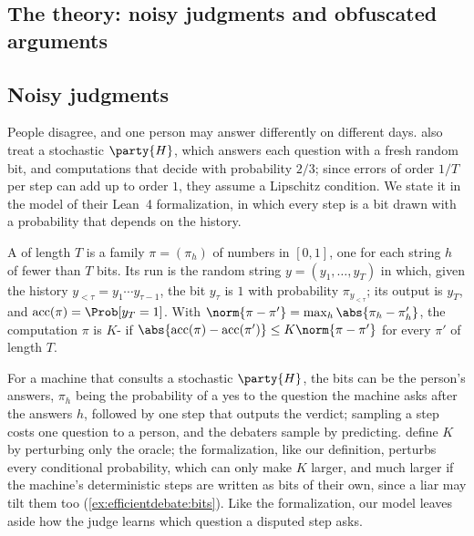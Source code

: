 \begin{refsection}
\section{The theory: noisy judgments and obfuscated arguments}\label{sec:efficientdebate:noisy}

\subsection{Noisy judgments}\label{sec:efficientdebate:stochastic}

People disagree, and one person may answer differently on different days. \Textcite{BrownCohenEtAl2024} also treat a stochastic $\party{H}$, which answers each question with a fresh random bit, and computations that decide with probability $2/3$; since errors of order $1/T$ per step can add up to order $1$, they assume a Lipschitz condition. We state it in the model of their Lean~4 formalization, in which every step is a bit drawn with a probability that depends on the history.

\begin{definition}\label{def:efficientdebate:stochastic}
A  of length $T$ is a family $\pi=(\pi_h)$ of numbers in $[0,1]$, one for each string $h$ of fewer than $T$ bits. Its run is the random string $y=(y_1,\dots,y_T)$ in which, given the history $y_{<\tau}=y_1\cdots y_{\tau-1}$, the bit $y_\tau$ is $1$ with probability $\pi_{y_{<\tau}}$; its output is $y_T$, and $\efficientdebateacc(\pi)=\Prob[y_T=1]$. With $\norm{\pi-\pi'}=\max_h\abs{\pi_h-\pi'_h}$, the computation $\pi$ is $K$- if $\abs{\efficientdebateacc(\pi)-\efficientdebateacc(\pi')}\le K\norm{\pi-\pi'}$ for every $\pi'$ of length $T$.
\end{definition}

For a machine that consults a stochastic $\party{H}$, the bits can be the person's answers, $\pi_h$ being the probability of a yes to the question the machine asks after the answers $h$, followed by one step that outputs the verdict; sampling a step costs one question to a person, and the debaters sample by predicting. \Textcite[Definition~6.1]{BrownCohenEtAl2024} define $K$ by perturbing only the oracle; the formalization, like our definition, perturbs every conditional probability, which can only make $K$ larger, and much larger if the machine's deterministic steps are written as bits of their own, since a liar may tilt them too (\cref{ex:efficientdebate:bits}). Like the formalization, our model leaves aside how the judge learns which question a disputed step asks.


\end{refsection}

